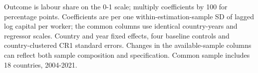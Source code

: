\begin{table}[htbp]\centering
\caption{H1a. Capital coefficients with a fixed common sample}
\label{tab:measurement_h1}
\small
{}
\begin{tablenotes}\footnotesize Outcome is labour share on the 0-1 scale; multiply coefficients by 100 for percentage points. Coefficients are per one within-estimation-sample SD of lagged log capital per worker; the common columns use identical country-years and regressor scales. Country and year fixed effects, four baseline controls and country-clustered CR1 standard errors. Changes in the available-sample columns can reflect both sample composition and specification. Common sample includes 18 countries, 2004-2021.\end{tablenotes}
\end{table}